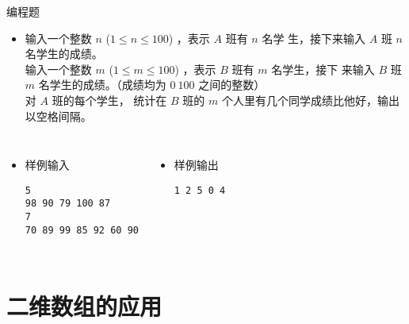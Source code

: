 \begin{frame}[fragile]
{{\begin{itemize}
            \end{itemize}

        }{
            \begin{exampleblock}{编程题}

                \begin{itemize}
                    \item 输入一个整数 $n$ ($1 \le n \le 100$) ，表示 $A$ 班有 $n$ 名学 生，接下来输入 $A$ 班 $n$ 名学生的成绩。\\
                        输入一个整数 $m$ ($1 \le m \le 100$) ，表示 $B$ 班有 $m$ 名学生，接下 来输入 $B$ 班 $m$ 名学生的成绩。（成绩均为 $0~100$ 之间的整数）\\
                        对 $A$ 班的每个学生， 统计在 $B$ 班的 $m$ 个人里有几个同学成绩比他好，输出以空格间隔。
                \end{itemize}

                \begin{columns}[onlytextwidth,T]
                    \begin{itemize}
                        \item 样例输入

                            \lstinline|5|\\
                            \lstinline|98 90 79 100 87|\\
                            \lstinline|7|\\
                            \lstinline|70 89 99 85 92 60 90|

                    \end{itemize}

                    \begin{itemize}
                        \item 样例输出

                            \lstinline|1 2 5 0 4|

                    \end{itemize}
                \end{columns}

            \end{exampleblock}
        }
    }
\end{frame}


\section{二维数组的应用}

